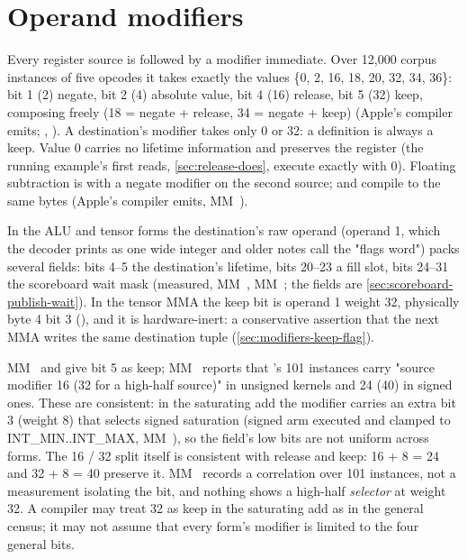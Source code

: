 \section{Operand modifiers}\label{sec:operand-modifiers}

Every register source is followed by a modifier immediate. Over 12,000 corpus instances of five opcodes
it takes exactly the values \{0, 2, 16, 18, 20, 32, 34, 36\}: bit 1 (2) negate, bit 2 (4) absolute value, bit 4 (16)
release, bit 5 (32) keep, composing freely (18 = negate + release, 34 = negate + keep) (Apple's compiler emits;
, ). A destination's modifier takes only 0 or 32: a definition
is always a keep. Value 0 carries no lifetime information and preserves the register (the running example's first
reads, \cref{sec:release-does}, execute exactly with 0). Floating subtraction is  with a negate modifier on the
second source;  and  compile to the same bytes (Apple's compiler emits, MM~).

In the ALU and tensor forms the destination's raw operand (operand 1, which
the decoder prints as one wide integer and older notes call the "flags word") packs several fields: bits 4–5 the
destination's lifetime, bits 20–23 a fill slot, bits 24–31 the scoreboard wait mask (measured, MM~, MM~; the fields are \cref{sec:scoreboard-publish-wait}). In the
tensor MMA the keep bit is operand 1 weight 32, physically byte 4 bit 3 (), and
it is hardware-inert: a conservative assertion that the next MMA writes the same destination tuple (\cref{sec:modifiers-keep-flag}).

MM~ and  give bit 5 as keep; MM~ reports that
's 101 instances carry "source modifier 16 (32 for a high-half source)" in unsigned
kernels and 24 (40) in signed ones. These are consistent: in
the saturating add the modifier carries an extra bit 3 (weight 8) that selects signed saturation (signed arm executed and clamped to
INT\_MIN..INT\_MAX, MM~), so the field's low bits are not uniform across forms. The 16 / 32 split itself is
consistent with release and keep: 16 + 8 = 24 and 32 + 8 = 40 preserve it. MM~ records a correlation over 101
instances, not a measurement isolating the bit, and nothing shows a high-half \emph{selector} at weight 32. A compiler may
treat 32 as keep in the saturating add as in the general census; it may not assume that every form's modifier is limited to the
four general bits.

